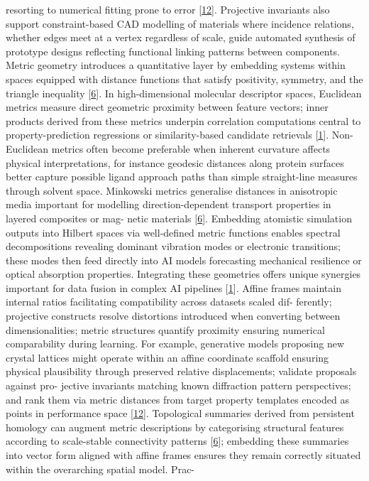 \documentclass[
]{article}
\begin{document}
resorting to numerical fitting prone to error
{[}\hyperref[_bookmark52]{12}{]}. Projective invariants also support
constraint-based CAD modelling of materials where incidence relations,
whether edges meet at a vertex regardless of scale, guide automated
synthesis of prototype designs reflecting functional linking patterns
between components. Metric geometry introduces a quantitative layer by
embedding systems within spaces equipped with distance functions that
satisfy positivity, symmetry, and the triangle inequality
{[}\hyperref[_bookmark46]{6}{]}. In high-dimensional molecular
descriptor spaces, Euclidean metrics measure direct geometric proximity
between feature vectors; inner products derived from these metrics
underpin correlation computations central to property-prediction
regressions or similarity-based candidate retrievals
{[}\hyperref[_bookmark41]{1}{]}. Non-Euclidean metrics often become
preferable when inherent curvature affects physical interpretations, for
instance geodesic distances along protein surfaces better capture
possible ligand approach paths than simple straight-line measures
through solvent space. Minkowski metrics generalise distances in
anisotropic media important for modelling direction-dependent transport
properties in layered composites or mag- netic materials
{[}\hyperref[_bookmark46]{6}{]}. Embedding atomistic simulation outputs
into Hilbert spaces via well-defined metric functions enables spectral
decompositions revealing dominant vibration modes or electronic
transitions; these modes then feed directly into AI models forecasting
mechanical resilience or optical absorption properties. Integrating
these geometries offers unique synergies important for data fusion in
complex AI pipelines {[}\hyperref[_bookmark41]{1}{]}. Affine frames
maintain internal ratios facilitating compatibility across datasets
scaled dif- ferently; projective constructs resolve distortions
introduced when converting between dimensionalities; metric structures
quantify proximity ensuring numerical comparability during learning. For
example, generative models proposing new crystal lattices might operate
within an affine coordinate scaffold ensuring physical plausibility
through preserved relative displacements; validate proposals against
pro- jective invariants matching known diffraction pattern perspectives;
and rank them via metric distances from target property templates
encoded as points in performance space {[}\hyperref[_bookmark52]{12}{]}.
Topological summaries derived from persistent homology can augment
metric descriptions by categorising structural features according to
scale-stable connectivity patterns {[}\hyperref[_bookmark46]{6}{]};
embedding these summaries into vector form aligned with affine frames
ensures they remain correctly situated within the overarching spatial
model. Prac-
\end{document}
